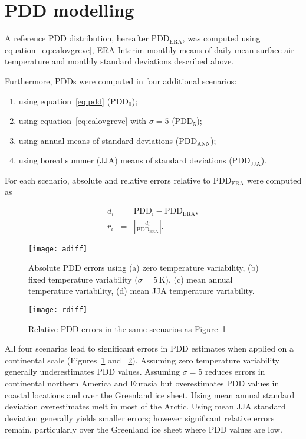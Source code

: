 \documentclass[twocolumn]{igs}
\begin{document}

\section{PDD modelling}

A reference PDD distribution, hereafter $\mathrm{PDD_{ERA}}$, was computed using equation~\ref{eq:calovgreve}, ERA-Interim monthly means of daily mean surface air temperature and monthly standard deviations described above.

Furthermore, PDDs were computed in four additional scenarios:

\begin{enumerate}
  \item using equation~\ref{eq:pdd} ($\mathrm{PDD_{0}}$);
  \item using equation~\ref{eq:calovgreve} with $\sigma=5$ ($\mathrm{PDD_{5}}$);
  \item using annual means of standard deviations ($\mathrm{PDD_{ANN}}$);
  \item using boreal summer (JJA) means of standard deviations ($\mathrm{PDD_{JJA}}$).
\end{enumerate}

For each scenario, absolute and relative errors relative to $\mathrm{PDD_{ERA}}$ were computed as

\begin{eqnarray}
  d_i &=& \mathrm{PDD}_i - \mathrm{PDD_{ERA}}, \\
  r_i &=& \left|\frac{d_i}{\mathrm{PDD_{ERA}}}\right|.
\end{eqnarray}

\begin{figure}
  \centering\texttt{[image: adiff]}
  \caption{Absolute PDD errors using (a) zero temperature variability, (b) fixed temperature variability ($\sigma=5\,\mathrm{K}$), (c) mean annual temperature variability, (d) mean JJA temperature variability.}
  \label{fig:adiff}
\end{figure}

\begin{figure}
  \centering\texttt{[image: rdiff]}
  \caption{Relative PDD errors in the same scenarios as Figure~\ref{fig:adiff}}
  \label{fig:rdiff}
\end{figure}

All four scenarios lead to significant errors in PDD estimates when applied on a continental scale (Figures~\ref{fig:adiff} and ~\ref{fig:rdiff}). Assuming zero temperature variability generally underestimates PDD values. Assuming $\sigma=5$ reduces errors in continental northern America and Eurasia but overestimates PDD values in coastal locations and over the Greenland ice sheet. Using mean annual standard deviation overestimates melt in most of the Arctic. Using mean JJA standard deviation generally yields smaller errors; however significant relative errors remain, particularly over the Greenland ice sheet where PDD values are low.
\end{document}
